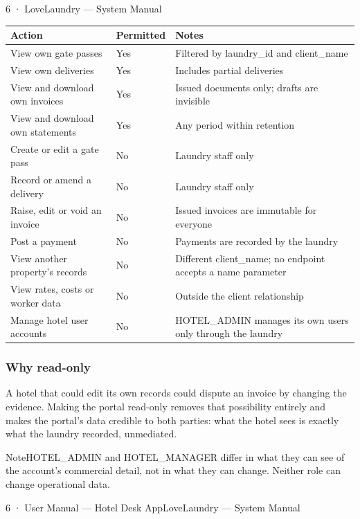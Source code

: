 \documentclass[11pt,a4paper,oneside]{book}
\begin{document}
6 · LoveLaundry — System Manual

\begin{center}\small
\begin{tabularx}{\linewidth}{|X|X|X|}
\hline
\rowcolor{lightgrey}
\textbf{Action} & \textbf{Permitted} & \textbf{Notes} \\ \hline
View own gate passes & Yes & Filtered by laundry\_id and client\_name \\ \hline
View own deliveries & Yes & Includes partial deliveries \\ \hline
View and download own invoices & Yes & Issued documents only; drafts are invisible \\ \hline
View and download own statements & Yes & Any period within retention \\ \hline
Create or edit a gate pass & No & Laundry staff only \\ \hline
Record or amend a delivery & No & Laundry staff only \\ \hline
Raise, edit or void an invoice & No & Issued invoices are immutable for everyone \\ \hline
Post a payment & No & Payments are recorded by the laundry \\ \hline
View another property's records & No & Different client\_name; no endpoint accepts a name parameter \\ \hline
View rates, costs or worker data & No & Outside the client relationship \\ \hline
Manage hotel user accounts & No & HOTEL\_ADMIN manages its own users only through the laundry \\ \hline
\end{tabularx}
\end{center}
\subsubsection*{Why read-only}
A hotel that could edit its own records could dispute an invoice by changing the evidence. Making the portal read-only removes that possibility entirely and makes the portal's data credible to both parties: what the hotel sees is exactly what the laundry recorded, unmediated.

\begin{notebox}NoteHOTEL\_ADMIN and HOTEL\_MANAGER differ in what they can see of the account's commercial detail, not in what they can change. Neither role can change operational data.\end{notebox}
6 · User Manual — Hotel Desk AppLoveLaundry — System Manual
\end{document}
